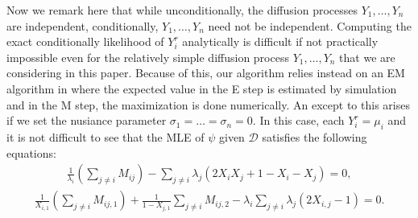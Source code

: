\documentclass[12pt]{article}%
\begin{document}
Now we remark here that while unconditionally, the diffusion processes $Y_1,\ldots, Y_n$ are independent, 
conditionally, $Y_1,\ldots,Y_n$ need not be independent.  
Computing the exact conditionally likelihood of $Y_i^r$ analytically is difficult if not practically impossible 
even for the relatively simple diffusion process $Y_1,\ldots,Y_n$ that we are considering in this paper. 
Because of this, our algorithm relies instead on an EM algorithm in where the expected value in the E step 
is estimated by simulation and in the M step, the maximization is done numerically.     
An except to this arises if we set the nusiance parameter $\sigma_1 = \ldots = \sigma_n = 0$.
In this case, each $Y_i^r = \mu_i$ and it is not difficult to see that the MLE of $\psi$ given $\mathcal D$ 
satisfies the following equations:
\begin{eqnarray}
\frac{1}{\lambda_i} \left(\sum_{j\neq i} M_{ij}\right)  -  \sum_{j\neq i} \lambda_j (2 X_i X_j + 1 - X_i - X_j) = 0,
\end{eqnarray}
\begin{eqnarray}
\frac{1}{X_{i,1}} \left(\sum_{j\neq i} M_{ij,1}\right)  + \frac{1}{1-X_{j,1}} \sum_{j\neq i} M_{ij,2} 
-
\lambda_i \sum_{j\neq i}  \lambda_j (2 X_{i,j} - 1) =0.
\end{eqnarray}
\end{document}

